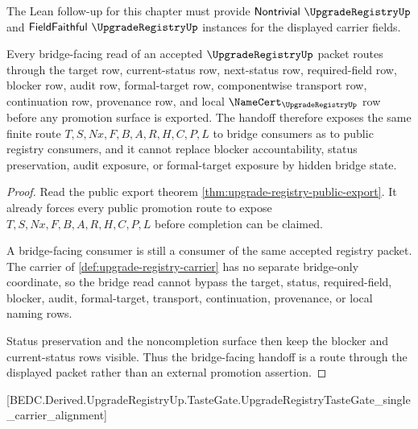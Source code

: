 The Lean follow-up for this chapter must provide $\mathsf{Nontrivial}\ \UpgradeRegistryUp$ and $\mathsf{FieldFaithful}\ \UpgradeRegistryUp$ instances for the displayed carrier fields.

\begin{theorem}
\label{thm:upgrade-registry-bridged-handoff-surface}
Every bridge-facing read of an accepted $\UpgradeRegistryUp$ packet routes through the target row, current-status row, next-status row, required-field row, blocker row, audit row, formal-target row, componentwise transport row, continuation row, provenance row, and local $\NameCert_{\UpgradeRegistryUp}$ row before any promotion surface is exported. The handoff therefore exposes the same finite route $T,S,Nx,F,B,A,R,H,C,P,L$ to bridge consumers as to public registry consumers, and it cannot replace blocker accountability, status preservation, audit exposure, or formal-target exposure by hidden bridge state.
\end{theorem}
\begin{proof}
Read the public export theorem \autoref{thm:upgrade-registry-public-export}. It already forces every public promotion route to expose $T,S,Nx,F,B,A,R,H,C,P,L$ before completion can be claimed.

A bridge-facing consumer is still a consumer of the same accepted registry packet. The carrier of \autoref{def:upgrade-registry-carrier} has no separate bridge-only coordinate, so the bridge read cannot bypass the target, status, required-field, blocker, audit, formal-target, transport, continuation, provenance, or local naming rows.

Status preservation and the noncompletion surface then keep the blocker and current-status rows visible. Thus the bridge-facing handoff is a route through the displayed packet rather than an external promotion assertion.
\end{proof}

[BEDC.Derived.UpgradeRegistryUp.TasteGate.UpgradeRegistryTasteGate\_single\_carrier\_alignment]

